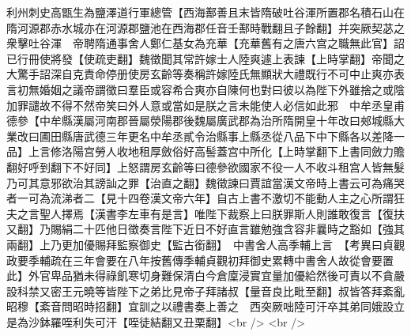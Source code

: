 利州刺史高甑生為鹽澤道行軍總管【西海鄯善且末皆隋破吐谷渾所置郡名積石山在隋河源郡赤水城亦在河源郡鹽池在西海郡任音壬鄯時戰翻且子餘翻】并突厥契苾之衆擊吐谷渾　帝聘隋通事舍人鄭仁基女為充華【充華舊有之唐六宫之職無此官】詔已行冊使將發【使疏吏翻】魏徵聞其常許嫁士人陸爽遽上表諫【上時掌翻】帝聞之大驚手詔深自克責命停册使房玄齡等奏稱許嫁陸氏無顯狀大禮既行不可中止爽亦表言初無婚姻之議帝謂徵曰羣臣或容希合爽亦自陳何也對曰彼以為陛下外雖捨之或陰加罪譴故不得不然帝笑曰外人意或當如是朕之言未能使人必信如此邪　中牟丞皇甫德參【中牟縣漢屬河南郡晉屬滎陽郡後魏屬廣武郡為治所隋開皇十年改曰郟城縣大業改曰圃田縣唐武德三年更名中牟丞貳令治縣事上縣丞從八品下中下縣各以差降一品】上言修洛陽宫勞人收地租厚斂俗好高髻蓋宫中所化【上時掌翻下上書同斂力贍翻好呼到翻下不好同】上怒謂房玄齡等曰德參欲國家不役一人不收斗租宫人皆無髮乃可其意邪欲治其謗訕之罪【治直之翻】魏徵諫曰賈誼當漢文帝時上書云可為痛哭者一可為流涕者二【見十四卷漢文帝六年】自古上書不激切不能動人主之心所謂狂夫之言聖人擇焉【漢書李左車有是言】唯陛下裁察上曰朕罪斯人則誰敢復言【復扶又翻】乃賜絹二十匹他日徵奏言陛下近日不好直言雖勉強含容非曩時之豁如【強其兩翻】上乃更加優賜拜監察御史【監古銜翻】　中書舍人高季輔上言　【考異曰貞觀政要季輔疏在三年會要在八年按舊傳季輔貞觀初拜御史累轉中書舍人故從會要置此】外官卑品猶未得祿飢寒切身難保清白今倉廩浸實宜量加優給然後可責以不貪嚴設科禁又密王元曉等皆陛下之弟比見帝子拜諸叔【量音良比毗至翻】叔皆答拜紊亂昭穆【紊音問昭時招翻】宜訓之以禮書奏上善之　西突厥咄陸可汗卒其弟同娥設立是為沙鉢羅咥利失可汗【咥徒結翻又丑栗翻】<br />
<br />
